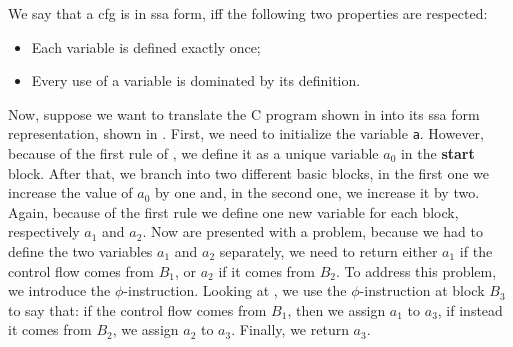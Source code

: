 \begin{definition}\label{def:ssa}
  We say that a \gls{cfg} is in \gls{ssa} form, iff the following two properties are respected:
  \begin{itemize}
    \item Each variable is defined exactly once;
    \item Every use of a variable is dominated by its definition.
  \end{itemize}
\end{definition}

Now, suppose we want to translate the C program shown in  into its \gls{ssa} form representation, shown in . First, we need to initialize the variable \texttt a. However, because of the first rule of , we define it as a unique variable $a_0$ in the \textbf{start} block. After that, we branch into two different basic blocks, in the first one we increase the value of $a_0$ by one and, in the second one, we increase it by two. Again, because of the first rule we define one new variable for each block, respectively $a_1$ and $a_2$.
Now are presented with a problem, because we had to define the two variables $a_1$ and $a_2$ separately, we need to return either $a_1$ if the control flow comes from $B_1$, or $a_2$ if it comes from $B_2$. To address this problem, we introduce the $\phi$-instruction. Looking at , we use the $\phi$-instruction at block $B_3$ to say that: if the control flow comes from $B_1$, then we assign $a_1$ to $a_3$, if instead it comes from $B_2$, we assign $a_2$ to $a_3$. Finally, we return $a_3$.

